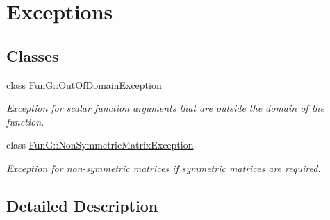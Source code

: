 \hypertarget{group__Exceptions}{}\section{Exceptions}
\label{group__Exceptions}
\subsection*{Classes}
\begin{DoxyCompactItemize}
\item 
class \hyperlink{classFunG_1_1OutOfDomainException}{Fun\+G\+::\+Out\+Of\+Domain\+Exception}
\begin{DoxyCompactList}\small\item\em Exception for scalar function arguments that are outside the domain of the function. \end{DoxyCompactList}\item 
class \hyperlink{classFunG_1_1NonSymmetricMatrixException}{Fun\+G\+::\+Non\+Symmetric\+Matrix\+Exception}
\begin{DoxyCompactList}\small\item\em Exception for non-\/symmetric matrices if symmetric matrices are required. \end{DoxyCompactList}\end{DoxyCompactItemize}


\subsection{Detailed Description}
